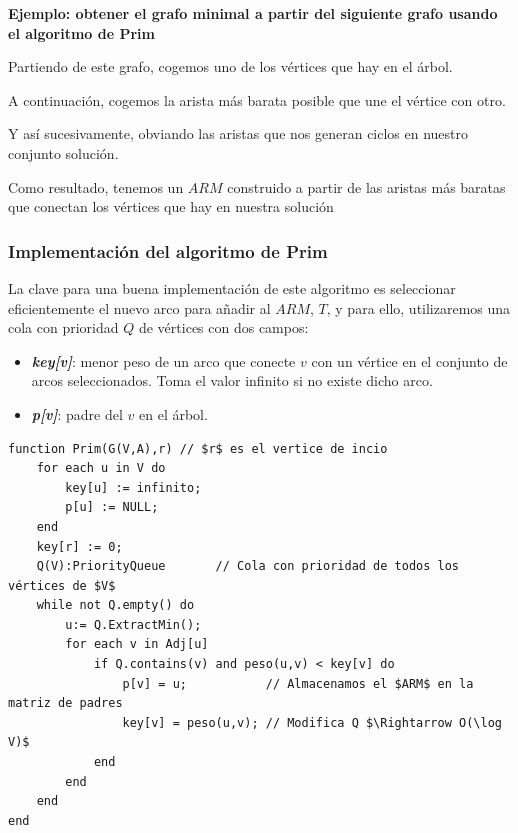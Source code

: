 \documentclass[10pt,a4paper,spanish]{report}
\theoremstyle{definition}
\theoremstyle{remark}
\begin{document}
\textbf{\textcolor{electriccrimson}{Ejemplo}: obtener el grafo minimal a partir del siguiente grafo usando el algoritmo de Prim}

\begin{center}


Partiendo de este grafo, cogemos uno de los vértices que hay en el árbol.



A continuación, cogemos la arista más barata posible que une el vértice con otro.



Y así sucesivamente, obviando las aristas que nos generan ciclos en nuestro conjunto solución.







Como resultado, tenemos un $ARM$ construido a partir de las aristas más baratas que conectan los vértices que hay en nuestra solución

\end{center}

\subsubsection{\textcolor{electriccrimson}Implementación del algoritmo de Prim}

La clave para una buena implementación de este algoritmo es seleccionar eficientemente el nuevo arco para añadir al $ARM$, $T$, y para ello, utilizaremos una cola con prioridad $Q$ de vértices con dos campos:
\begin{itemize}
    \item \textbf{\textit{\textcolor{electriccrimson}{key[v]}}}: menor peso de un arco que conecte $v$ con un vértice en el conjunto de arcos seleccionados. Toma el valor infinito si no existe dicho arco.
    \item \textbf{\textit{\textcolor{electriccrimson}{p[v]}}}: padre del $v$ en el árbol.
\end{itemize}

\begin{verbatim}
function Prim(G(V,A),r) // $r$ es el vertice de incio
    for each u in V do
        key[u] := infinito;
        p[u] := NULL;
    end
    key[r] := 0;
    Q(V):PriorityQueue       // Cola con prioridad de todos los vértices de $V$
    while not Q.empty() do
        u:= Q.ExtractMin();
        for each v in Adj[u]
            if Q.contains(v) and peso(u,v) < key[v] do
                p[v] = u;           // Almacenamos el $ARM$ en la matriz de padres
                key[v] = peso(u,v); // Modifica Q $\Rightarrow O(\log V)$
            end
        end
    end
end
\end{verbatim}
\end{document}
